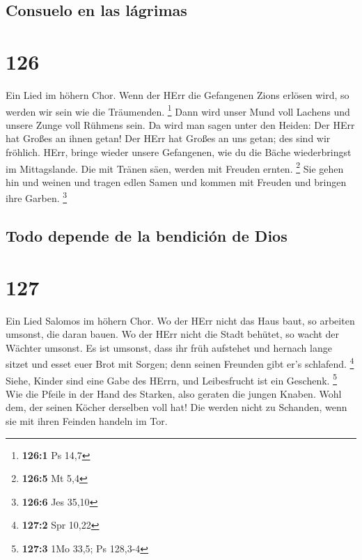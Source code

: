\hypertarget{consuelo-en-las-luxe1grimas}{%
\subsection{Consuelo en las
lágrimas}\label{consuelo-en-las-luxe1grimas}}

\hypertarget{section-125}{%
\section{126}\label{section-125}}

 Ein Lied im höhern Chor. Wenn der HErr die Gefangenen
Zions erlösen wird, so werden wir sein wie die Träumenden. \footnote{\textbf{126:1}
  Ps 14,7}  Dann wird unser Mund voll Lachens und unsere
Zunge voll Rühmens sein. Da wird man sagen unter den Heiden: Der HErr
hat Großes an ihnen getan!  Der HErr hat Großes an uns
getan; des sind wir fröhlich.  HErr, bringe wieder unsere
Gefangenen, wie du die Bäche wiederbringst im Mittagslande.
 Die mit Tränen säen, werden mit Freuden ernten.
\footnote{\textbf{126:5} Mt 5,4}  Sie gehen hin und weinen
und tragen edlen Samen und kommen mit Freuden und bringen ihre Garben.
\footnote{\textbf{126:6} Jes 35,10}

\hypertarget{todo-depende-de-la-bendiciuxf3n-de-dios}{%
\subsection{Todo depende de la bendición de
Dios}\label{todo-depende-de-la-bendiciuxf3n-de-dios}}

\hypertarget{section-126}{%
\section{127}\label{section-126}}

 Ein Lied Salomos im höhern Chor. Wo der HErr nicht das
Haus baut, so arbeiten umsonst, die daran bauen. Wo der HErr nicht die
Stadt behütet, so wacht der Wächter umsonst.  Es ist
umsonst, dass ihr früh aufstehet und hernach lange sitzet und esset euer
Brot mit Sorgen; denn seinen Freunden gibt er's schlafend. \footnote{\textbf{127:2}
  Spr 10,22}  Siehe, Kinder sind eine Gabe des HErrn, und
Leibesfrucht ist ein Geschenk. \footnote{\textbf{127:3} 1Mo 33,5; Ps
  128,3-4}  Wie die Pfeile in der Hand des Starken, also
geraten die jungen Knaben.  Wohl dem, der seinen Köcher
derselben voll hat! Die werden nicht zu Schanden, wenn sie mit ihren
Feinden handeln im Tor.

